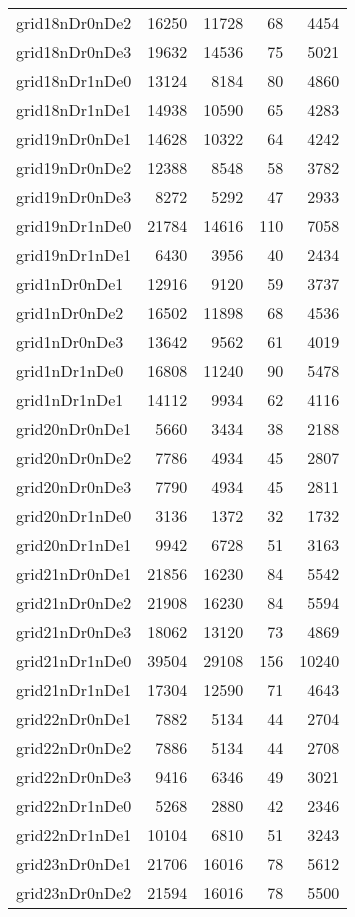\begin{tabular}{lrrrr}
grid18nDr0nDe2 & 16250 & 11728 & 68 & 4454 \\
grid18nDr0nDe3 & 19632 & 14536 & 75 & 5021 \\
grid18nDr1nDe0 & 13124 & 8184 & 80 & 4860 \\
grid18nDr1nDe1 & 14938 & 10590 & 65 & 4283 \\
grid19nDr0nDe1 & 14628 & 10322 & 64 & 4242 \\
grid19nDr0nDe2 & 12388 & 8548 & 58 & 3782 \\
grid19nDr0nDe3 & 8272 & 5292 & 47 & 2933 \\
grid19nDr1nDe0 & 21784 & 14616 & 110 & 7058 \\
grid19nDr1nDe1 & 6430 & 3956 & 40 & 2434 \\
grid1nDr0nDe1 & 12916 & 9120 & 59 & 3737 \\
grid1nDr0nDe2 & 16502 & 11898 & 68 & 4536 \\
grid1nDr0nDe3 & 13642 & 9562 & 61 & 4019 \\
grid1nDr1nDe0 & 16808 & 11240 & 90 & 5478 \\
grid1nDr1nDe1 & 14112 & 9934 & 62 & 4116 \\
grid20nDr0nDe1 & 5660 & 3434 & 38 & 2188 \\
grid20nDr0nDe2 & 7786 & 4934 & 45 & 2807 \\
grid20nDr0nDe3 & 7790 & 4934 & 45 & 2811 \\
grid20nDr1nDe0 & 3136 & 1372 & 32 & 1732 \\
grid20nDr1nDe1 & 9942 & 6728 & 51 & 3163 \\
grid21nDr0nDe1 & 21856 & 16230 & 84 & 5542 \\
grid21nDr0nDe2 & 21908 & 16230 & 84 & 5594 \\
grid21nDr0nDe3 & 18062 & 13120 & 73 & 4869 \\
grid21nDr1nDe0 & 39504 & 29108 & 156 & 10240 \\
grid21nDr1nDe1 & 17304 & 12590 & 71 & 4643 \\
grid22nDr0nDe1 & 7882 & 5134 & 44 & 2704 \\
grid22nDr0nDe2 & 7886 & 5134 & 44 & 2708 \\
grid22nDr0nDe3 & 9416 & 6346 & 49 & 3021 \\
grid22nDr1nDe0 & 5268 & 2880 & 42 & 2346 \\
grid22nDr1nDe1 & 10104 & 6810 & 51 & 3243 \\
grid23nDr0nDe1 & 21706 & 16016 & 78 & 5612 \\
grid23nDr0nDe2 & 21594 & 16016 & 78 & 5500 \\

\end{tabular}
